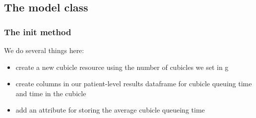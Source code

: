 \documentclass[
  letterpaper,
  DIV=11,
  numbers=noendperiod]{scrreprt}
\providecommand{\tightlist}{%
  \setlength{\itemsep}{0pt}\setlength{\parskip}{0pt}}\usepackage{longtable,booktabs,array}
\begin{document}
\subsection{The model class}\label{the-model-class-9}

\subsubsection{\texorpdfstring{The \textbf{init}
method}{The init method}}\label{the-init-method-10}

We do several things here:

\begin{itemize}
\tightlist
\item
  create a new cubicle resource using the number of cubicles we set in g
\item
  create columns in our patient-level results dataframe for cubicle
  queuing time and time in the cubicle
\item
  add an attribute for storing the average cubicle queueing time
\end{itemize}
\end{document}
